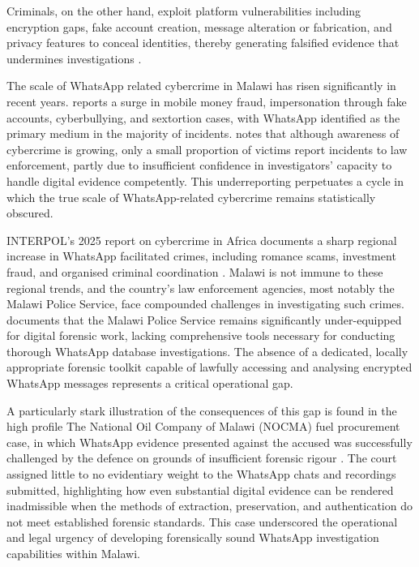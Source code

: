\documentclass[12pt,a4paper]{report}
\begin{document}
Criminals, on the other hand, exploit platform vulnerabilities including encryption gaps, fake account creation, message alteration or fabrication, and privacy features to conceal identities, thereby generating falsified evidence that undermines investigations \citep{vijayan2018}.

The scale of WhatsApp related cybercrime in Malawi has risen significantly in recent years. \citet{chiputula2024} reports a surge in mobile money fraud, impersonation through fake accounts, cyberbullying, and sextortion cases, with WhatsApp identified as the primary medium in the majority of incidents. \citet{nyirenda2024} notes that although awareness of cybercrime is growing, only a small proportion of victims report incidents to law enforcement, partly due to insufficient confidence in investigators' capacity to handle digital evidence competently. This underreporting perpetuates a cycle in which the true scale of WhatsApp-related cybercrime remains statistically obscured.

INTERPOL's 2025 report on cybercrime in Africa documents a sharp regional increase in WhatsApp facilitated crimes, including romance scams, investment fraud, and organised criminal coordination \citep{interpol2025}. Malawi is not immune to these regional trends, and the country's law enforcement agencies, most notably the Malawi Police Service, face compounded challenges in investigating such crimes. \citet{chimoyo2024} documents that the Malawi Police Service remains significantly under-equipped for digital forensic work, lacking comprehensive tools necessary for conducting thorough WhatsApp database investigations. The absence of a dedicated, locally appropriate forensic toolkit capable of lawfully accessing and analysing encrypted WhatsApp messages represents a critical operational gap.

A particularly stark illustration of the consequences of this gap is found in the high profile The National Oil Company of Malawi (NOCMA) fuel procurement case, in which WhatsApp evidence presented against the accused was successfully challenged by the defence on grounds of insufficient forensic rigour \citep{makossah2021}. The court assigned little to no evidentiary weight to the WhatsApp chats and recordings submitted, highlighting how even substantial digital evidence can be rendered inadmissible when the methods of extraction, preservation, and authentication do not meet established forensic standards. This case underscored the operational and legal urgency of developing forensically sound WhatsApp investigation capabilities within Malawi.
\end{document}
